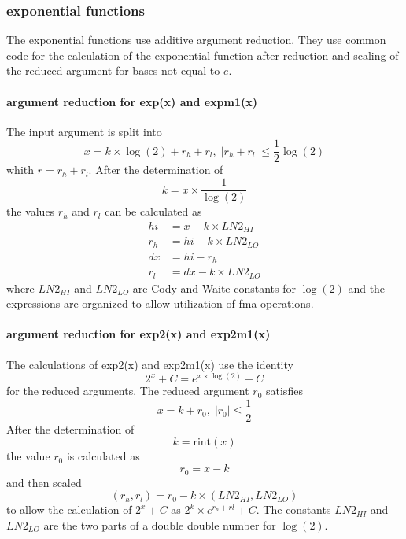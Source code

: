 \documentclass[10pt,a4paper,final,oneside]{article}
\numberwithin{equation}{subsection}
\begin{document}
\subsubsection{exponential functions}
\label{sub_sec:expxxx}

The exponential functions use additive argument reduction.
They use common code for the calculation of the exponential function
after reduction and scaling of the reduced argument for bases not
equal to $e$.

\paragraph{argument reduction for exp(x) and expm1(x)}

The input argument is split into
\begin{equation}
  x = k \times \log{(2)} + r_h + r_l, \;
  |r_h +r_l| \le \frac{1}{2} \log{(2)}
\end{equation}
whith $r = r_h + r_l$.
After the determination of
\[
k = x \times \frac{1}{\log{(2)}}
\]
the values $r_h$ and $r_l$ can be calculated as
\[
\begin{aligned}
  hi &= x - k \times LN2_{HI} \\
  r_h &= hi - k \times LN2_{LO} \\
  dx & = hi - r_h \\
  r_l &= dx - k \times LN2_{LO}
\end{aligned}
\]
where $LN2_{HI}$ and $LN2_{LO}$ are Cody and Waite constants for $\log(2)$
and the expressions are organized to allow utilization of fma operations.

\paragraph{argument reduction for exp2(x) and exp2m1(x)}

The calculations of exp2(x) and exp2m1(x) use the
identity
\begin{equation}
  2^x + C = e^{x \times \log{(2)}} + C
\end{equation}
for the reduced arguments.
The reduced argument $ r_0 $ satisfies
\begin{equation}
  x = k + r_0, \;
  |r_0| \le \frac{1}{2}
\end{equation}
After the determination of
\[
k = \text{rint}(x)
\]
the value $r_0$ is calculated as
\[
r_0 = x - k
\]
and then scaled
\[
(r_h, r_l) = r_0 - k \times (LN2_{HI}, LN2_{LO})
\]
to allow the calculation of $ 2^x + C $ as $ 2^k \times e^{r_h+ rl} + C$.
The constants $LN2_{HI}$ and $LN2_{LO}$ are the two parts of a double double number for $\log{(2)}$.
\end{document}
